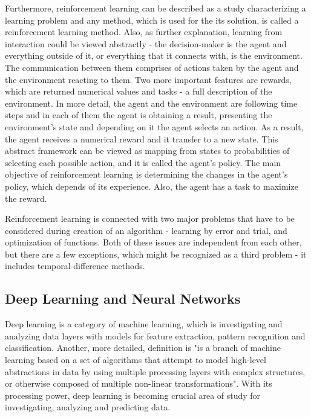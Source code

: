 \documentclass{article}
\begin{document}
Furthermore, reinforcement learning can be described as a study characterizing a learning problem and any method, which is used for the its solution, is called a reinforcement learning method\cite{sutton1998reinforcement}. Also, as further explanation, learning from interaction could be viewed abstractly - the decision-maker is the agent and everything outside of it, or everything that it connects with, is the environment. The communication between them comprises of actions taken by the agent and the environment reacting to them. Two more important features are rewards, which are returned numerical values and tasks - a full description of the environment. In more detail, the agent and the environment are following time steps and in each of them the agent is obtaining a result, presenting the environment's state and depending on it the agent selects an action. As a result, the agent receives a numerical reward and it transfer to a new state. This abstract framework can be viewed as mapping from states to probabilities of selecting each possible action, and it is called the agent's policy\cite{sutton1998reinforcement}. The main objective of reinforcement learning is determining the changes in the agent's policy, which depends of its experience. Also, the agent has a task to maximize the reward. 

Reinforcement learning is connected with two major problems that have to be considered during creation of an algorithm - learning by error and trial, and optimization of functions. Both of these issues are independent from each other, but there are a few exceptions, which might be recognized as a third problem - it includes temporal-difference methods. \cite[Ch.\ 1, p. 16]{sutton1998reinforcement} 

\subsection{{\textbf{Deep Learning and Neural Networks}}}

Deep learning is a category of machine learning, which is investigating and analyzing data layers with models for feature extraction, pattern recognition and classification\cite{schmidhuber2015deep}. Another, more detailed, definition is "is a branch of machine learning based on a set of algorithms that attempt to model high-level abstractions in data by using multiple processing layers with complex structures, or otherwise composed of multiple non-linear transformations"\cite{wikiDeep}. With its processing power, deep learning is becoming crucial area of study for investigating, analyzing and predicting data\cite{chen2014big}.
\end{document}
